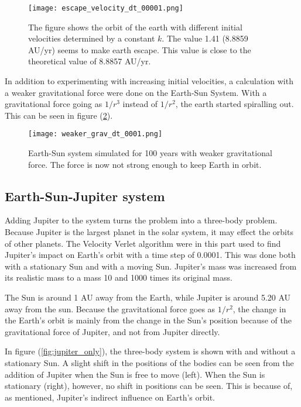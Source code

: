 \documentclass[10pt,a4paper,titlepage]{article}
\begin{document}
\begin{figure}[]
\centering
\centering\texttt{[image: escape\_velocity\_dt\_00001.png]}
\caption{The figure shows the orbit of the earth with different initial velocities determined by a constant $k$. The value 1.41 (8.8859 AU/yr) seems to make earth escape. This value is close to the theoretical value of 8.8857 AU/yr. \label{fig:escape}}
\end{figure}

In addition to experimenting with increasing initial velocities, a calculation with a weaker gravitational force were done on the Earth-Sun System. With a gravitational force going as $1/r^3$ instead of $1/r^2$, the earth started spiralling out. This can be seen in figure (\ref{fig:weaker}).

\begin{figure}[]
\centering
\centering\texttt{[image: weaker\_grav\_dt\_0001.png]}
\caption{Earth-Sun system simulated for 100 years with weaker gravitational force. The force is now not strong enough to keep Earth in orbit. \label{fig:weaker}}
\end{figure}

\subsection{Earth-Sun-Jupiter system}
Adding Jupiter to the system turns the problem into a three-body problem. Because Jupiter is the largest planet in the solar system, it may effect the orbits of other planets. The Velocity Verlet algorithm were in this part used to find Jupiter's impact on Earth's orbit with a time step of 0.0001. This was done both with a stationary Sun and with a moving Sun. Jupiter's mass was increased from its realistic mass to a mass 10 and 1000 times its original mass. 

The Sun is around 1 AU away from the Earth, while Jupiter is around 5.20 AU away from the sun. Because the gravitational force goes as $1/r^2$, the change in the Earth's orbit is mainly from the change in the Sun's position because of the gravitational force of Jupiter, and not from Jupiter directly. 

In figure (\ref{fig:jupiter_only}), the three-body system is shown with and without a stationary Sun. A slight shift in the positions of the bodies can be seen from the addition of Jupiter when the Sun is free to move (left). When the Sun is stationary (right), however, no shift in positions can be seen. This is because of, as mentioned, Jupiter's indirect influence on Earth's orbit.
\end{document}
